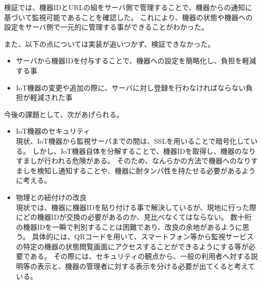 検証では、機器IDとURLの組をサーバ側で管理することで、機器からの通知に基づいて監視可能であることを確認した。
これにより、機器の状態や機器への設定をサーバ側で一元的に管理する事ができることがわかった。

また、以下の点については実装が追いつかず、検証できなかった。
\begin{itemize}
\item サーバから機器IDを付与することで、機器への設定を簡略化し、負担を軽減する事
\item IoT機器の変更や追加の際に、サーバに対し登録を行わなければならない負担が軽減された事
\end{itemize}

今後の課題として、次があげられる。
\begin{itemize}
\item IoT機器のセキュリティ\\
	現状、IoT機器から監視サーバまでの間は、SSLを用いることで暗号化している。
	しかし、IoT機器自体を分解することで、機器IDを取得し、機器のなりすましが行われる危険がある。
	そのため、なんらかの方法で機器へのなりすましを検知し通知することや、機器に耐タンパ性を持たせる必要があるように考える。
\item 物理との紐付けの改良\\
	現状では、機器に機器IDを貼り付ける事で解決しているが、現地に行った際にどの機器IDが交換の必要があるのか、見比べなくてはならない。
	数十桁の機器IDを一瞬で判別することは困難であり、改良の余地があるように思う。
	具体的には、QRコードを用いて、スマートフォン等から監視サービスの特定の機器の状態閲覧画面にアクセスすることができるようにする等が必要である。
	その際には、セキュリティの観点から、一般の利用者へ対する説明等の表示と、機器の管理者に対する表示を分ける必要が出てくると考えている。


\end{itemize}
